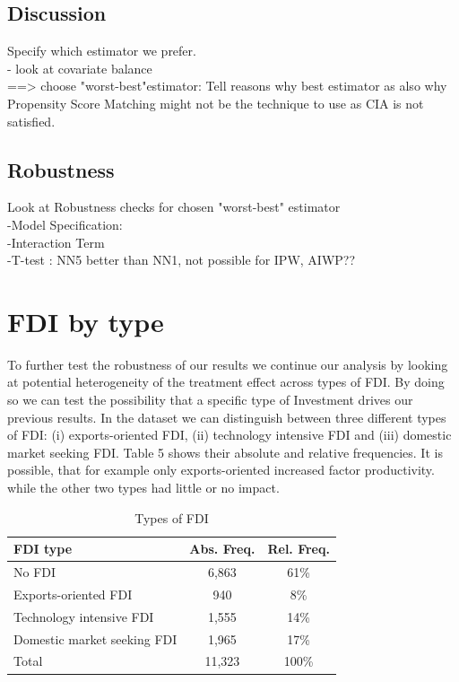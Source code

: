 \documentclass[a4paper,12pt]{scrartcl}
\begin{document}
\newpage
\subsection{Discussion}
Specify which estimator we prefer.\\
- look at covariate balance \\
==> choose "worst-best"estimator: Tell reasons why best estimator as also why Propensity Score Matching might not be the technique to use as CIA is not satisfied. 

\subsection{Robustness}
Look at Robustness checks for chosen "worst-best" estimator \\
-Model Specification: \\
-Interaction Term\\
-T-test : NN5 better than NN1, not possible for IPW, AIWP??






\section{FDI by type}

To further test the robustness of our results  we continue our analysis by looking at potential heterogeneity of the treatment effect across types of FDI. By doing so we can test the possibility that a specific type of Investment drives our previous results. In the dataset we can distinguish between three different types of FDI: (i) exports-oriented FDI, (ii) technology intensive FDI and (iii) domestic market seeking FDI. Table 5 shows their absolute and relative frequencies. It is possible, that for example only exports-oriented increased factor productivity. while the other two types had little or no impact.

\begin{table}

  \centering
   \caption{Types of FDI} 

\begin{tabular}{lcc} \hline
 FDI type&Abs. Freq.&Rel. Freq. \\
\hline
No FDI&6,863 & 61\% \\
Exports-oriented FDI&940 & 8\%\\
Technology intensive FDI & 1,555 & 14\% \\
Domestic market seeking FDI & 1,965 & 17\% \\
Total & 11,323 & 100\% \\
\end{tabular}
\end{table}
\end{document}
